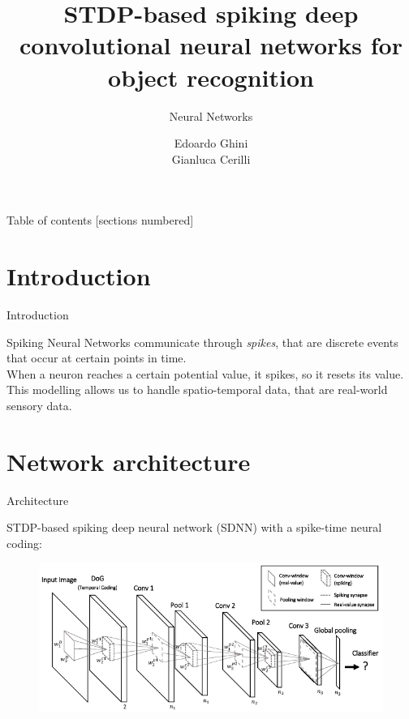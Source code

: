 \documentclass[10pt]{beamer}
\title{STDP-based spiking deep convolutional neural networks for object recognition}
\subtitle{Neural Networks}
\date{}
\author{Edoardo Ghini\\Gianluca Cerilli}
\institute{Sapienza Università di Roma}
\begin{document}
\maketitle

\begin{frame}{Table of contents}
  [sections numbered]
  \tableofcontents[hideallsubsections]
\end{frame}

\section{Introduction}

\begin{frame}[fragile]{Introduction}

Spiking Neural Networks communicate through \textit{spikes}, that are discrete events that occur at certain points in time.\\
\bigskip
When a neuron reaches a certain potential value, it spikes, so it resets its value.\\
\bigskip
This modelling allows us to handle spatio-temporal data,
that are real-world sensory data.

\end{frame}

\section{Network architecture}

\begin{frame}{Architecture}

STDP-based spiking deep neural network (SDNN) with a spike-time neural coding:

\begin{figure}[h]
	\centering
	\includegraphics[width=\textwidth]{images/architecture}
\end{figure}

\end{frame}
\end{document}
